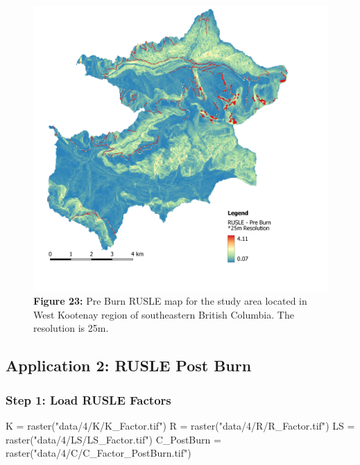\documentclass[
]{article}
\newenvironment{Shaded}{\begin{snugshade}}{\end{snugshade}}
\newcommand{\FunctionTok}[1]{\textcolor[rgb]{0.00,0.00,0.00}{#1}}
\newcommand{\NormalTok}[1]{#1}
\newcommand{\OtherTok}[1]{\textcolor[rgb]{0.56,0.35,0.01}{#1}}
\newcommand{\StringTok}[1]{\textcolor[rgb]{0.31,0.60,0.02}{#1}}
\begin{document}
\begin{figure}
\centering
\includegraphics{img/rusle_25m_prefire.png}
\caption{\textbf{Figure 23:} Pre Burn RUSLE map for the study area located in West Kootenay region of southeastern British Columbia. The resolution is 25m.}
\end{figure}

\hypertarget{sec-application-2-rusle-post-burn}{%
\subsection*{Application 2: RUSLE Post Burn}\label{sec-application-2-rusle-post-burn}}

\hypertarget{sec-step-1-load-rusle-factors_post}{%
\subsubsection*{Step 1: Load RUSLE Factors}\label{sec-step-1-load-rusle-factors_post}}

\begin{Shaded}
\begin{Highlighting}[]
\NormalTok{K }\OtherTok{=} \FunctionTok{raster}\NormalTok{(}\StringTok{"data/4/K/K\_Factor.tif"}\NormalTok{)}
\NormalTok{R }\OtherTok{=} \FunctionTok{raster}\NormalTok{(}\StringTok{"data/4/R/R\_Factor.tif"}\NormalTok{)}
\NormalTok{LS }\OtherTok{=} \FunctionTok{raster}\NormalTok{(}\StringTok{"data/4/LS/LS\_Factor.tif"}\NormalTok{)}
\NormalTok{C\_PostBurn }\OtherTok{=} \FunctionTok{raster}\NormalTok{(}\StringTok{"data/4/C/C\_Factor\_PostBurn.tif"}\NormalTok{)}
\end{Highlighting}
\end{Shaded}
\end{document}
